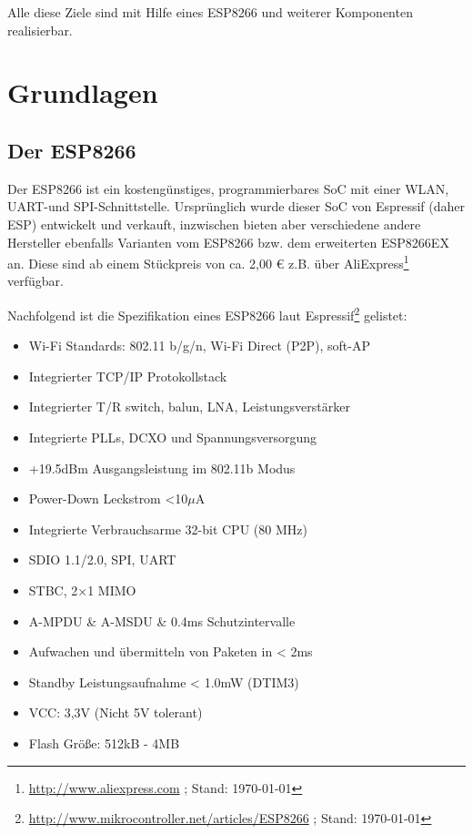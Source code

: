 Alle diese Ziele sind mit Hilfe eines ESP8266 und weiterer Komponenten realisierbar.

\section{Grundlagen}
\subsection{Der ESP8266}
Der ESP8266 ist ein kostengünstiges, programmierbares \ac{SoC} mit einer \acs{WLAN}, \acs{UART}-und \acs{SPI}-Schnittstelle.
Ursprünglich wurde dieser \acs{SoC} von Espressif (daher ESP) entwickelt und verkauft, inzwischen bieten aber verschiedene andere Hersteller ebenfalls Varianten vom ESP8266 bzw. dem erweiterten ESP8266EX an.
Diese sind ab einem Stückpreis von ca. 2,00 € z.B. über AliExpress\footnote{\url{http://www.aliexpress.com} ; Stand: \today} verfügbar.

Nachfolgend ist die Spezifikation eines ESP8266 laut Espressif\footnote{\url{http://www.mikrocontroller.net/articles/ESP8266} ; Stand: \today} gelistet:

\begin{itemize}
    \item Wi-Fi Standards: 802.11 b/g/n, Wi-Fi Direct (\acs{P2P}), \acs{soft-AP}
    \item Integrierter TCP/IP Protokollstack
    \item Integrierter \acs{T/R} switch, \acs{balun}, \acs{LNA}, Leistungsverstärker
    \item Integrierte \acs{PLL}s, \acs{DCXO} und Spannungsversorgung
    \item +19.5dBm Ausgangsleistung im 802.11b Modus
    \item Power-Down Leckstrom <10$\mu$A
    \item Integrierte Verbrauchsarme 32-bit CPU (80 MHz)
    \item \acs{SDIO} 1.1/2.0, \acs{SPI}, \acs{UART}
    \item \acs{STBC}, 2×1 \acs{MIMO}
    \item \acs{A-MPDU} \& \acs{A-MSDU} \& 0.4ms Schutzintervalle
    \item Aufwachen und übermitteln von Paketen in < 2ms
    \item Standby Leistungsaufnahme < 1.0mW (\acs{DTIM3})
    \item\acs{VCC}: 3,3V (Nicht 5V tolerant)
    \item Flash Größe: 512kB - 4MB 
\end{itemize}


